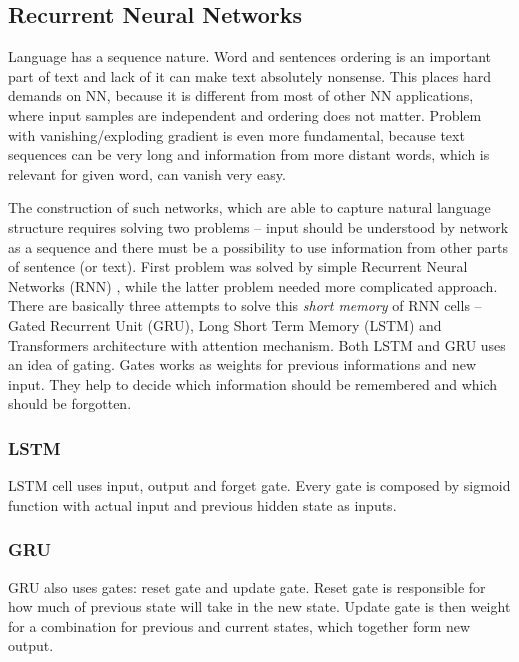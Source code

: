 \subsection{Recurrent Neural Networks}
Language has a sequence nature. Word and sentences ordering is an important part of text and lack of it can make text absolutely nonsense. This places hard demands on NN, because it is different from most of other NN applications, where input samples are independent and ordering does not matter. Problem with vanishing/exploding gradient %
is even more fundamental, because text sequences can be very long and information from more distant words, which is relevant for given word, can vanish very easy. %

The construction of such networks,  which are able to capture natural language structure requires solving two problems -- input should be understood by network as a sequence and there must be a possibility to use information from other parts of sentence (or text). First problem was solved by simple Recurrent Neural Networks (RNN) %
, while the latter problem needed more complicated approach. There are basically three attempts to solve this \textit{short memory} of RNN cells -- Gated Recurrent Unit (GRU), Long Short Term Memory (LSTM) and Transformers architecture with attention mechanism. Both LSTM and GRU uses an idea of gating. Gates works as weights for previous informations and new input. They help to decide which information should be remembered and which should be forgotten. %
\subsubsection*{LSTM} LSTM cell uses input, output and forget gate. Every gate is composed by sigmoid function with actual input and previous hidden state as inputs. %
\subsubsection*{GRU}
GRU also uses gates: reset gate and update gate. %
Reset gate is responsible for how much of previous state will take in the new state. Update gate is then weight for a combination for previous and current states, which together form new output.

